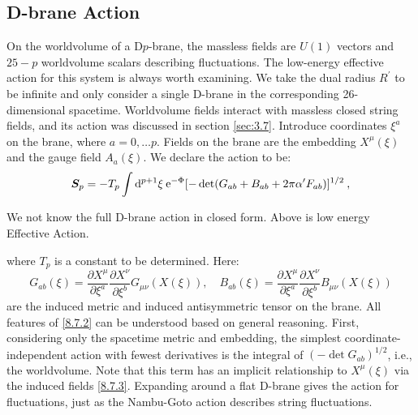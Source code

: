 \subsection*{D-brane Action}
On the worldvolume of a D$p$-brane, the massless fields are $U(1)$ vectors and $25{-}p$ worldvolume scalars describing fluctuations. The low-energy effective action for this system is always worth examining. 
We take the dual radius $R^{\prime}$ to be infinite and only consider a single D-brane in the corresponding 26-dimensional spacetime. Worldvolume fields interact with massless closed string fields, and its action was discussed in section \ref{sec:3.7}. 
Introduce coordinates $\xi^{a}$ on the brane, where $a=0, \ldots p$. Fields on the brane are the embedding $X^{\mu}(\xi)$ and the gauge field $A_{a}(\xi)$. 
We declare the action to be:
\begin{equation}
	\bm{S}_{p} = -T_{p} \int \mathrm{d}^{p+1} \xi \: 
	\mathrm{e}^{-\Phi}[-\operatorname{det}(G_{ab} + B_{ab} + 2 \pi \alpha^{\prime} F_{a b})]^{1/2} \:, \label{8.7.2}
\end{equation}
\begin{tcolorbox}
	\begin{remark}
		We not know the full D-brane action in closed form. Above is low energy Effective Action.
	\end{remark}
\end{tcolorbox}
where $T_{p}$ is a constant to be determined. 
Here:
\begin{equation}
	G_{ab}(\xi) = \frac{\partial X^{\mu}}{\partial \xi^{a}} \frac{\partial X^{\nu}}{\partial \xi^{b}} G_{\mu \nu}(X(\xi)), \quad 
	B_{ab}(\xi) = \frac{\partial X^{\mu}}{\partial \xi^{a}} \frac{\partial X^{\nu}}{\partial \xi^{b}} B_{\mu \nu}(X(\xi)) \label{8.7.3}
\end{equation}
are the induced metric and induced antisymmetric tensor on the brane. 
All features of \eqref{8.7.2} can be understood based on general reasoning. First, considering only the spacetime metric and embedding, 
the simplest coordinate-independent action with fewest derivatives is the integral of $(-\operatorname{det} G_{a b})^{1/2}$, i.e., the worldvolume. 
Note that this term has an implicit relationship to $X^{\mu}(\xi)$ via the induced fields \eqref{8.7.3}. Expanding around a flat D-brane gives the action for fluctuations, 
just as the Nambu-Goto action describes string fluctuations.
